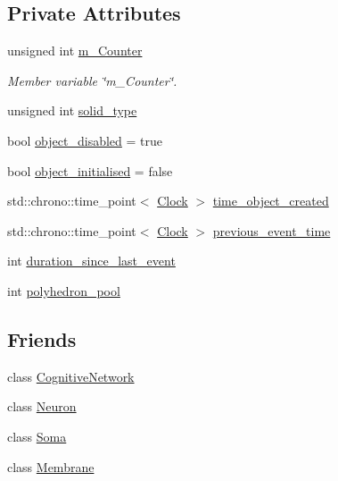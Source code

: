 \subsection*{Private Attributes}
\begin{DoxyCompactItemize}
\item 
unsigned int \mbox{\hyperlink{classSolid_ab267c0a27586fa46a1b03bb0750caf5a}{m\+\_\+\+Counter}}
\begin{DoxyCompactList}\small\item\em Member variable \char`\"{}m\+\_\+\+Counter\char`\"{}. \end{DoxyCompactList}\item 
unsigned int \mbox{\hyperlink{classSolid_a4cb0429a28598d5501553787524b705d}{solid\+\_\+type}}
\item 
bool \mbox{\hyperlink{classSolid_ac521c984065957c82c239d5fb8be82ff}{object\+\_\+disabled}} = true
\item 
bool \mbox{\hyperlink{classSolid_ac92543b277d9a01d4cfbdf7fd71d3e1f}{object\+\_\+initialised}} = false
\item 
std\+::chrono\+::time\+\_\+point$<$ \mbox{\hyperlink{universe_8h_a0ef8d951d1ca5ab3cfaf7ab4c7a6fd80}{Clock}} $>$ \mbox{\hyperlink{classSolid_ab511520c2e523c203c1ca7b97f573f65}{time\+\_\+object\+\_\+created}}
\item 
std\+::chrono\+::time\+\_\+point$<$ \mbox{\hyperlink{universe_8h_a0ef8d951d1ca5ab3cfaf7ab4c7a6fd80}{Clock}} $>$ \mbox{\hyperlink{classSolid_ace5c8628a4f60d96029d8acea4580ab5}{previous\+\_\+event\+\_\+time}}
\item 
int \mbox{\hyperlink{classSolid_ad845ec39ddd38670049e9c6e046f2454}{duration\+\_\+since\+\_\+last\+\_\+event}}
\item 
int \mbox{\hyperlink{classSolid_abd4b935f7835fd0f8b50b526f6399731}{polyhedron\+\_\+pool}}
\end{DoxyCompactItemize}
\subsection*{Friends}
\begin{DoxyCompactItemize}
\item 
class \mbox{\hyperlink{classSolid_ad04bbaef84caa0d408ec09a1c1302f5f}{Cognitive\+Network}}
\item 
class \mbox{\hyperlink{classSolid_aa410d74ba34b18a9f6bdf24323c4ee5b}{Neuron}}
\item 
class \mbox{\hyperlink{classSolid_aaa07b7b364b620b9a781f30a5cd9f5ea}{Soma}}
\item 
class \mbox{\hyperlink{classSolid_ac790db405644a01723104c3c0c8128bb}{Membrane}}
\end{DoxyCompactItemize}
